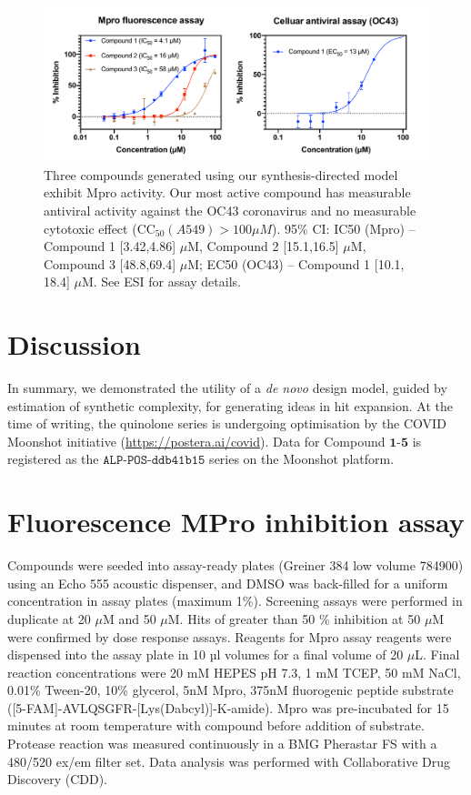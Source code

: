 \begin{figure}
    \centering
    \includegraphics[scale=0.36]{Chapters/Ranking/Figs/data_curve.pdf}
    \caption{Three compounds generated using our synthesis-directed model exhibit Mpro activity. Our most active compound has measurable antiviral activity against the OC43 coronavirus and no measurable cytotoxic effect ($\mathrm{CC}_{50} (A549)>100 \mu M$). 95\% CI: IC50 (Mpro) -- Compound 1 [3.42,4.86] $\mu$M, Compound 2 [15.1,16.5] $\mu$M, Compound 3 [48.8,69.4] $\mu$M; EC50 (OC43) -- Compound 1 [10.1, 18.4] $\mu$M. See ESI for assay details.}
    \label{fig:data}
\end{figure}

\section{Discussion} \label{sec:discussion}

In summary, we demonstrated the utility of a \emph{de novo} design model, guided by estimation of synthetic complexity, for generating ideas in hit expansion. At the time of writing, the quinolone series is undergoing optimisation by the COVID Moonshot initiative (\url{https://postera.ai/covid}). Data for Compound $\mathbf{1}$-$\mathbf{5}$ is registered as the $\texttt{ALP-POS-ddb41b15}$ series on the Moonshot platform. 

\section{Fluorescence MPro inhibition assay}

Compounds were seeded into assay-ready plates (Greiner 384 low volume 784900) using an Echo 555 acoustic dispenser, and DMSO was back-filled for a uniform concentration in assay plates (maximum 1\%). Screening assays were performed in duplicate at 20 $\mu$M and 50 $\mu$M. Hits of greater than 50 \% inhibition at 50 $\mu$M were confirmed by dose response assays. Reagents for Mpro assay reagents were dispensed into the assay plate in 10 µl volumes for a final volume of 20 $\mu$L. 
Final reaction concentrations were 20 mM HEPES pH 7.3, 1 mM TCEP, 50 mM NaCl, 0.01\% Tween-20, 10\% glycerol, 5nM Mpro, 375nM fluorogenic peptide substrate ([5-FAM]-AVLQSGFR-[Lys(Dabcyl)]-K-amide). 
Mpro was pre-incubated for 15 minutes at room temperature with compound before addition of substrate. Protease reaction was measured continuously in a BMG Pherastar FS with a 480/520 ex/em filter set. Data analysis was performed with Collaborative Drug Discovery (CDD).

